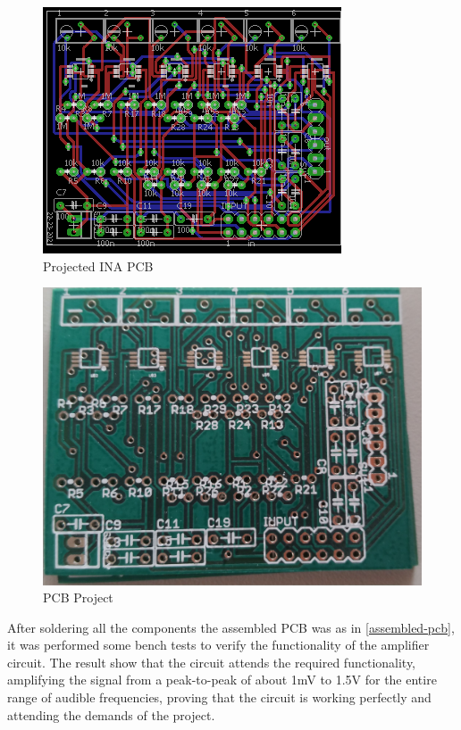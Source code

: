 \begin{figure}[!htpb]
  \centering
  \caption{Projected INA PCB}
  \label{INA-PCB}
  \includegraphics[scale=0.6]{images/INA/PCB}
\end{figure}

\begin{figure}[!htpb]
  \centering
  \caption{PCB Project}
  \label{INA-printed}
  \includegraphics[scale=0.1]{images/INA/printed.jpeg}
\end{figure}


After soldering all the components the assembled PCB was as in \autoref{assembled-pcb},
it was performed some bench tests to verify the
functionality of the amplifier circuit. The result show that the circuit attends
the required functionality, amplifying the signal from a peak-to-peak of about 1mV
to 1.5V for the entire range of audible frequencies, proving that the circuit is
working perfectly and attending the demands of the project.

